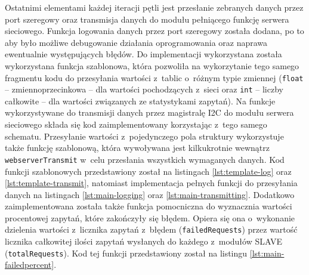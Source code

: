 Ostatnimi elementami każdej iteracji pętli jest przesłanie zebranych danych przez port szeregowy oraz transmisja danych
do modułu pełniącego funkcję serwera sieciowego. Funkcja logowania danych przez port szeregowy została dodana, po to aby
było możliwe debugowanie działania oprogramowania oraz naprawa ewentualnie występujących błędów. Do implementacji
wykorzystana została wykorzystana funkcja szablonowa, która pozwoliła na wykorzytanie tego samego fragmentu kodu do
przesyłania wartości z~tablic o~różnym typie zmiennej (\texttt{float} -- zmiennoprzecinkowa -- dla wartości pochodzących
z~sieci oraz \texttt{int} -- liczby całkowite -- dla wartości związanych ze statystykami zapytań). Na funkcje
wykorzystywane do transmisji danych przez magistralę I2C do modułu serwera sieciowego składa się kod zaimplementowany
korzystając z~tego samego schematu. Przesyłanie wartości z~pojedynczego pola struktury wykorzystuje także funkcję
szablonową, która wywoływana jest kilkukrotnie wewnątrz \texttt{webserverTransmit} w~celu przesłania wszystkich
wymaganych danych. Kod funkcji szablonowych przedstawiony został na listingach \ref{lst:template-log} oraz
\ref{lst:template-transmit}, natomiast implementacja pełnych funkcji do przesyłania danych na listingach
\ref{lst:main-logging} oraz \ref{lst:main-transmitting}. Dodatkowo zaimplementowana została także funkcja pomocniczna do
wyznacznia wartości procentowej zapytań, które zakończyły się błędem. Opiera się ona o~wykonanie dzielenia wartości
z~licznika zapytań z~błędem (\texttt{failedRequests}) przez wartość licznika całkowitej ilości zapytań wysłanych do
każdego z~modułów SLAVE (\texttt{totalRequests}). Kod tej funkcji przedstawiony został na listingu
\ref{lst:main-failedpercent}.









